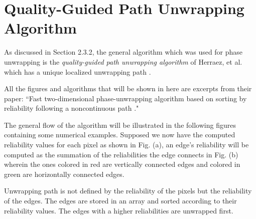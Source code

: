 \chapter{Quality-Guided Path Unwrapping Algorithm}

As discussed in Section 2.3.2, the general algorithm which was used for phase unwrapping is the \textit{quality-guided path unwrapping algorithm} of Herraez, et al. which has a unique localized unwrapping path \cite{Herraez2002}.

All the figures and algorithms that will be shown in here are excerpts from their paper: ``Fast two-dimensional phase-unwrapping algorithm based on sorting by reliability following a noncontinuous path \cite{Herraez2002}."

The general flow of the algorithm will be illustrated in the following figures containing some numerical examples. Supposed we now have the computed reliability values for each pixel as shown in Fig. (a), an edge's reliability will be computed as the summation of the reliabilities the edge connects in Fig. (b) wherein the ones colored in red are vertically connected edges and colored in green are horizontally connected edges.

Unwrapping path is not defined by the reliability of the pixels but the reliability of the edges. The edges are stored in an array and sorted according to their reliability values. The edges with a higher reliabilities are unwrapped first.

